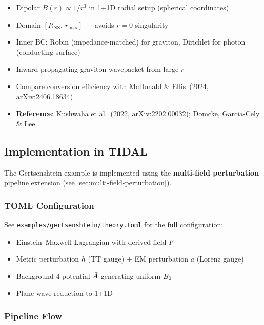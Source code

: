 \begin{itemize}
  \item Dipolar $B(r) \propto 1/r^3$ in 1+1D radial setup (spherical coordinates)
  \item Domain $[R_\mathrm{NS},\, r_\mathrm{max}]$ --- avoids $r = 0$ singularity
  \item Inner BC: Robin (impedance-matched) for graviton, Dirichlet for photon (conducting surface)
  \item Inward-propagating graviton wavepacket from large $r$
  \item Compare conversion efficiency with McDonald \& Ellis~(2024, arXiv:2406.18634)
  \item \textbf{Reference}: Kushwaha et al.~(2022, arXiv:2202.00032); Domcke, Garcia-Cely \& Lee~\cite{domcke2025scattering}
\end{itemize}

\subsection{Implementation in TIDAL}
\label{subsec:tidal-implementation}

The Gertsenshtein example is implemented using the \textbf{multi-field perturbation} pipeline extension (see \cref{sec:multi-field-perturbation}).

\subsubsection{TOML Configuration}
\label{subsec:toml-config}

See \texttt{examples/gertsenshtein/theory.toml} for the full configuration:
\begin{itemize}
  \item Einstein--Maxwell Lagrangian with derived field $F$
  \item Metric perturbation $h$ (TT gauge) + EM perturbation $a$ (Lorenz gauge)
  \item Background 4-potential $\bar{A}$ generating uniform $B_0$
  \item Plane-wave reduction to 1+1D
\end{itemize}

\subsubsection{Pipeline Flow}
\label{subsec:pipeline-flow}

